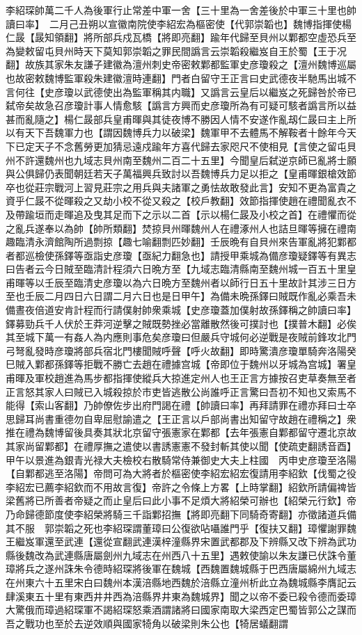 李紹琛帥萬二千人為後軍行止常差中軍一舍【三十里為一舍差後於中軍三十里也帥讀曰率】　二月己丑朔以宣徽南院使李紹宏為樞密使【代郭崇韜也】魏博指揮使楊仁晸【晸知領翻】將所部兵戍瓦橋【將即亮翻】踰年代歸至貝州以鄴都空虛恐兵至為變敕留屯貝州時天下莫知郭崇韜之罪民間譌言云崇韜殺繼岌自王於蜀【王于况翻】故族其家朱友謙子建徽為澶州刺史帝密敕鄴都監軍史彦瓊殺之【澶州魏博巡屬也故密敕魏博監軍殺朱建徽澶時連翻】門者白留守王正言曰史武德夜半馳馬出城不言何往【史彦瓊以武德使出為監軍稱其内職】又譌言云皇后以繼岌之死歸咎於帝已弑帝矣故急召彦瓊計事人情愈駭【譌言方興而史彦瓊所為有可疑可駭者譌言所以益甚而亂隨之】楊仁晸部兵皇甫暉與其徒夜博不勝因人情不安遂作亂刼仁晸曰主上所以有天下吾魏軍力也【謂因魏博兵力以破梁】魏軍甲不去體馬不解鞍者十餘年今天下已定天子不念舊勞更加猜忌遠戍踰年方喜代歸去家咫尺不使相見【言使之留屯貝州不許還魏州也九域志貝州南至魏州二百二十五里】今聞皇后弑逆京師已亂將士願與公俱歸仍表聞朝廷若天子萬福興兵致討以吾魏博兵力足以拒之【皇甫暉銀槍效節卒也從莊宗戰河上習見莊宗之用兵與夫諸軍之勇怯故敢發此言】安知不更為富貴之資乎仁晸不從暉殺之又劫小校不從又殺之【校戶教翻】效節指揮使趙在禮聞亂衣不及帶踰垣而走暉追及曳其足而下之示以二首【示以楊仁晸及小校之首】在禮懼而從之亂兵遂奉以為帥【帥所類翻】焚掠貝州暉魏州人在禮涿州人也詰旦暉等擁在禮南趣臨清永濟館陶所過剽掠【趣七喻翻剽匹妙翻】壬辰晩有自貝州來告軍亂將犯鄴都者都巡檢使孫鐸等亟詣史彦瓊【亟紀力翻急也】請授甲乘城為備彦瓊疑鐸等有異志曰告者云今日賊至臨清計程須六日晩方至【九域志臨清縣南至魏州城一百五十里皇甫暉等以壬辰至臨清史彦瓊以為六日晩方至魏州者以師行日五十里故計其涉三日方至也壬辰二月四日六日謂二月六日也是日甲午】為備未晩孫鐸曰賊既作亂必乘吾未備晝夜倍道安肯計程而行請僕射帥衆乘城【史彦瓊蓋加僕射故孫鐸稱之帥讀曰率】鐸募勁兵千人伏於王莽河逆擊之賊既勢挫必當離散然後可撲討也【撲普木翻】必俟其至城下萬一有姦人為内應則事危矣彦瓊曰但嚴兵守城何必逆戰是夜賊前鋒攻北門弓弩亂發時彦瓊將部兵宿北門樓聞賊呼聲【呼火故翻】即時驚潰彦瓊單騎奔洛陽癸巳賊入鄴都孫鐸等拒戰不勝亡去趙在禮據宫城【帝即位于魏州以牙城為宫城】署皇甫暉及軍校趙進為馬步都指揮使縱兵大掠進定州人也王正言方據按召吏草奏無至者正言怒其家人曰賊已入城殺掠於市吏皆逃散公尚誰呼正言驚曰吾初不知也又索馬不能得【索山客翻】乃帥僚佐步出府門謁在禮【帥讀曰率】再拜請罪在禮亦拜曰士卒思歸耳尚書重德勿自卑屈慰諭遣之【王正言以戶部尚書出知留守故趙在禮稱之】衆推在禮為魏博留後具奏其狀北京留守張憲家在鄴都【去年張憲自鄴都留守遷北京故其家尚留鄴都】在禮厚撫之遣使以書誘憲憲不發封斬其使以聞【使疏吏翻誘音酉】　甲午以景進為銀青光禄大夫檢校右散騎常侍兼御史大夫上柱國　丙申史彦瓊至洛陽【自鄴都逃至洛陽】帝問可為大將者於樞密使李紹宏紹宏復請用李紹欽【伐蜀之役李紹宏已薦李紹欽而不用故言復】帝許之令條上方畧【上時掌翻】紹欽所請偏禆皆梁舊將已所善者帝疑之而止皇后曰此小事不足煩大將紹榮可辦也【紹榮元行欽】帝乃命歸德節度使李紹榮將騎三千詣鄴招撫【將即亮翻下同騎奇寄翻】亦徵諸道兵備其不服　郭崇韜之死也李紹琛謂董璋曰公復欲呫囁誰門乎【復扶又翻】璋懼謝罪魏王繼岌軍還至武連【還從宣翻武連漢梓潼縣界宋置武都郡及下辨縣又改下辨為武功縣後魏改為武連縣唐屬劍州九域志在州西八十五里】遇敕使諭以朱友謙已伏誅令董璋將兵之遂州誅朱令德時紹琛將後軍在魏城【西魏置魏城縣于巴西唐屬綿州九域志在州東六十五里宋白曰魏州本漢涪縣地西魏於涪縣立潼州析此立為魏城縣李膺記云肆溪東五十里有東西井井西為涪縣界井東為魏城界】聞之以帝不委已殺令德而委璋大驚俄而璋過紹琛軍不謁紹琛怒乘酒謂諸將曰國家南取大梁西定巴蜀皆郭公之謀而吾之戰功也至於去逆效順與國家犄角以破梁則朱公也【犄居蟻翻謂